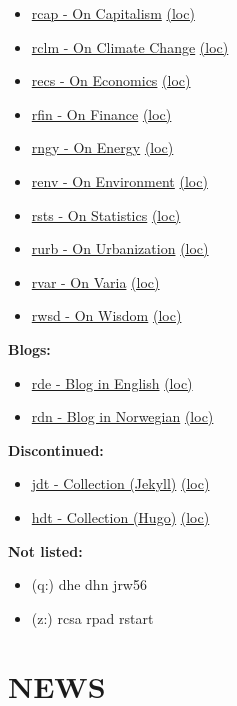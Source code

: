 \documentclass[
]{book}
\providecommand{\tightlist}{%
  \setlength{\itemsep}{0pt}\setlength{\parskip}{0pt}}
\begin{document}
\begin{itemize}
\tightlist
\item
  \href{https://dyrehaugen.github.io/rcap}{rcap - On Capitalism} \href{http://localhost/rcap}{(loc)}
\item
  \href{https://dyrehaugen.github.io/rclm}{rclm - On Climate Change} \href{http://localhost/rclm}{(loc)}
\item
  \href{https://dyrehaugen.github.io/recs}{recs - On Economics} \href{http://localhost/recs}{(loc)}
\item
  \href{https://dyrehaugen.github.io/rngy}{rfin - On Finance} \href{http://localhost/rfin}{(loc)}
\item
  \href{https://dyrehaugen.github.io/rngy}{rngy - On Energy} \href{http://localhost/rngy}{(loc)}
\item
  \href{https://dyrehaugen.github.io/renv}{renv - On Environment} \href{http://localhost/renv}{(loc)}
\item
  \href{https://dyrehaugen.github.io/rsts}{rsts - On Statistics} \href{http://localhost/rsts}{(loc)}
\item
  \href{https://dyrehaugen.github.io/rurb}{rurb - On Urbanization} \href{http://localhost/rurb}{(loc)}
\item
  \href{https://dyrehaugen.github.io/rvar}{rvar - On Varia} \href{http://localhost/rvar}{(loc)}
\item
  \href{https://dyrehaugen.github.io/rwsd}{rwsd - On Wisdom} \href{http://localhost/rwsd}{(loc)}
\end{itemize}

\textbf{Blogs:}

\begin{itemize}
\tightlist
\item
  \href{https://dyrehaugen.github.io/rde}{rde - Blog in English} \href{http://localhost/rde}{(loc)}
\item
  \href{https://dyrehaugen.github.io/rdn}{rdn - Blog in Norwegian} \href{http://localhost/rdn}{(loc)}
\end{itemize}

\textbf{Discontinued:}

\begin{itemize}
\tightlist
\item
  \href{https://dyrehaugen.github.io/jdt}{jdt - Collection (Jekyll)} \href{http://localhost/jdt}{(loc)}
\item
  \href{https://dyrehaugen.github.io/hdt}{hdt - Collection (Hugo)} \href{http://localhost/hdt}{(loc)}
\end{itemize}

\textbf{Not listed:}

\begin{itemize}
\tightlist
\item
  (q:) dhe dhn jrw56
\item
  (z:) rcsa rpad rstart
\end{itemize}

\hypertarget{news}{%
\chapter{NEWS}\label{news}}

  
\end{document}
